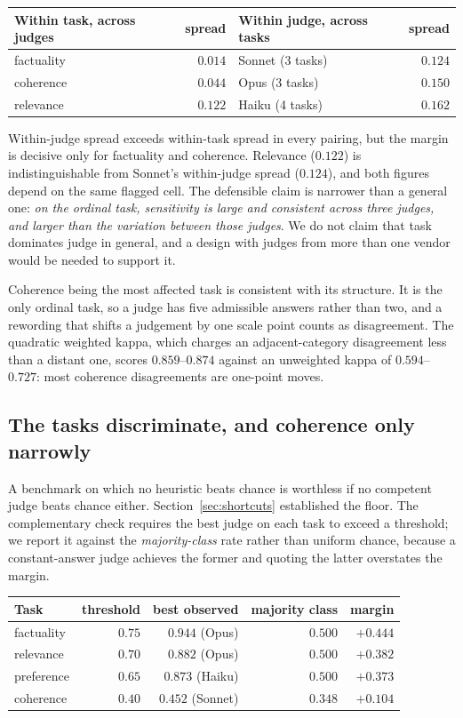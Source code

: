 \documentclass[11pt]{article}          %
\begin{document}
\begin{center}
\begin{tabular}{lrlr}
\toprule
Within task, across judges & spread & Within judge, across tasks & spread \\
\midrule
factuality & $0.014$ & Sonnet (3 tasks) & $0.124$ \\
coherence  & $0.044$ & Opus (3 tasks)   & $0.150$ \\
relevance  & $0.122$ & Haiku (4 tasks)  & $0.162$ \\
\bottomrule
\end{tabular}
\end{center}

Within-judge spread exceeds within-task spread in every pairing, but the margin
is decisive only for factuality and coherence. Relevance ($0.122$) is
indistinguishable from Sonnet's within-judge spread ($0.124$), and both figures
depend on the same flagged cell. The defensible claim is narrower than a general
one: \emph{on the ordinal task, sensitivity is large and consistent across three
judges, and larger than the variation between those judges}. We do not claim
that task dominates judge in general, and a design with judges from more than one
vendor would be needed to support it.

Coherence being the most affected task is consistent with its structure. It is
the only ordinal task, so a judge has five admissible answers rather than two,
and a rewording that shifts a judgement by one scale point counts as
disagreement. The quadratic weighted kappa, which charges an adjacent-category
disagreement less than a distant one, scores $0.859$--$0.874$ against an
unweighted kappa of $0.594$--$0.727$: most coherence disagreements are one-point
moves.

\subsection{The tasks discriminate, and coherence only narrowly}
\label{sec:results-discriminate}

A benchmark on which no heuristic beats chance is worthless if no competent judge
beats chance either. Section~\ref{sec:shortcuts} established the floor. The
complementary check requires the best judge on each task to exceed a threshold;
we report it against the \emph{majority-class} rate rather than uniform chance,
because a constant-answer judge achieves the former and quoting the latter
overstates the margin.

\begin{center}
\begin{tabular}{lrrrr}
\toprule
Task & threshold & best observed & majority class & margin \\
\midrule
factuality & $0.75$ & $0.944$ (Opus)   & $0.500$ & $+0.444$ \\
relevance  & $0.70$ & $0.882$ (Opus)   & $0.500$ & $+0.382$ \\
preference & $0.65$ & $0.873$ (Haiku)  & $0.500$ & $+0.373$ \\
coherence  & $0.40$ & $0.452$ (Sonnet) & $0.348$ & $+0.104$ \\
\bottomrule
\end{tabular}
\end{center}
\end{document}
